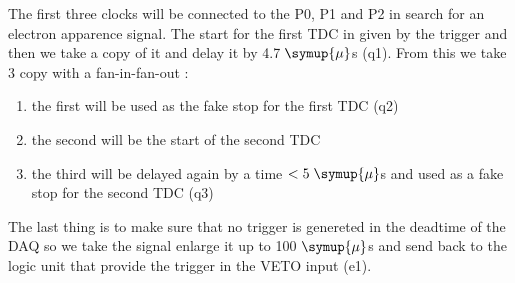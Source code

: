 The first three clocks will be connected to the P0, P1 and P2 in search for an electron
apparence signal. The start for the first TDC in given by the trigger and then we take a copy
of it and delay it by 4.7$\;\symup{\mu}$s (q1). From this we take 3 copy with a fan-in-fan-out :
\begin{enumerate}
\item the first will be used as the fake stop for the first TDC (q2)
\item the second will be the start of the second TDC
\item the third will be delayed again by a time $<5\;\symup{\mu}$s and used as a fake stop for the second TDC (q3)
\end{enumerate}
The last thing is to make sure that no trigger is genereted in the deadtime of the DAQ
so we take the signal enlarge it up to 100$\;\symup{\mu}$s and send back to the logic
unit that provide the trigger in the VETO input (e1).\\
